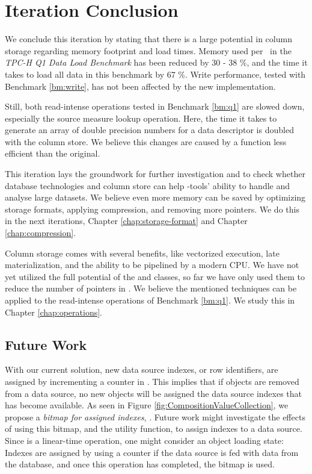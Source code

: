 \section{Iteration Conclusion}
\label{sec:Iteration Conclusion}
We conclude this iteration by stating that there is a large potential in column storage regarding memory footprint and load times. Memory used per \lineitem~in the \textit{TPC-H Q1 Data Load Benchmark} has been reduced by 30 - 38 \%, and the time it takes to load all data in this benchmark by 67 \%. Write performance, tested with Benchmark \ref{bm:write}, has not been affected by the new implementation.

Still, both read-intense operations tested in Benchmark \ref{bm:q1} are slowed down, especially the source measure lookup operation. Here, the time it takes to generate an array of double precision numbers for a data descriptor is doubled with the column store. We believe this changes are caused by a  function less efficient than the original.

This iteration lays the groundwork for further investigation and to check whether database technologies and column store can help \mdd-tools' ability to handle and analyse large datasets. We believe even more memory can be saved by optimizing storage formats, applying compression, and removing more pointers. We do this in the next iterations, Chapter \ref{chap:storage-format} and Chapter \ref{chap:compression}. 

Column storage comes with several benefits, like vectorized execution, late materialization, and the ability to be pipelined by a modern CPU. We have not yet utilized the full potential of the  and  classes, so far we have only used them to reduce the number of pointers in \gap. We believe the mentioned techniques can be applied to the read-intense operations of Benchmark \ref{bm:q1}. We study this in Chapter \ref{chap:operations}.

\subsection{Future Work}
\label{sub:column-store:future-work}
With our current solution, new data source indexes, or row identifiers, are assigned by incrementing a counter in . This implies that if objects are removed from a data source, no new objects will be assigned the data source indexes that has become available. As seen in Figure \ref{fig:CompositionValueCollection}, we propose a \textit{bitmap for assigned indexes}, . Future work might investigate the effects of using this bitmap, and the  utility function, to assign indexes to a data source. Since  is a linear-time operation, one might consider an object loading state: Indexes are assigned by using a counter if the data source is fed with data from the database, and once this operation has completed, the  bitmap is used.

